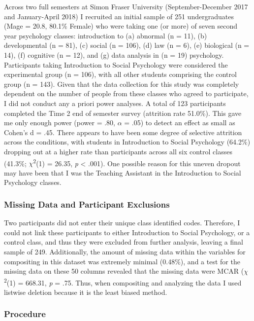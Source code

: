 \documentclass{sfuthesis}
\begin{document}
Across two full semesters at Simon Fraser University (September-December 2017 and January-April 2018) I recruited an initial sample of 251 undergraduates (Mage = 20.8, 80.1\% Female) who were taking one (or more) of seven second year psychology classes: introduction to (a) abnormal (n = 11), (b) developmental (n = 81), (c) social (n = 106), (d) law (n = 6), (e) biological (n = 14), (f) cognitive (n = 12), and (g) data analysis in (n = 19) psychology. Participants taking Introduction to Social Psychology were considered the experimental group (n = 106), with all other students comprising the control group (n = 143). Given that the data collection for this study was completely dependent on the number of people from these classes who agreed to participate, I did not conduct any a priori power analyses. A total of 123 participants completed the Time 2 end of semester survey (attrition rate 51.0\%). This gave me only enough power (power = .80, $\alpha$ = .05) to detect an effect as small as Cohen’s d = .45. There appears to have been some degree of selective attrition across the conditions, with students in Introduction to Social Psychology (64.2\%) dropping out at a higher rate than participants across all six control classes (41.3\%; $\chi$\textsuperscript{2}(1) = 26.35, \textit{p} < .001). One possible reason for this uneven dropout may have been that I was the Teaching Assistant in the Introduction to Social Psychology classes. 

\subsubsection{Missing Data and Participant Exclusions}

Two participants did not enter their unique class identified codes. Therefore, I could not link these participants to either Introduction to Social Psychology, or a control class, and thus they were excluded from further analysis, leaving a final sample of 249. Additionally, the amount of missing data within the variables for compositing in this dataset was extremely minimal (0.48\%), and a test for the missing data on these 50 columns revealed that the missing data were MCAR ($\chi$\textsuperscript{2}(1) = 668.31, \textit{p} = .75. Thus, when compositing and analyzing the data I used listwise deletion because it is the least biased method.

\subsubsection{Procedure}
\end{document}
